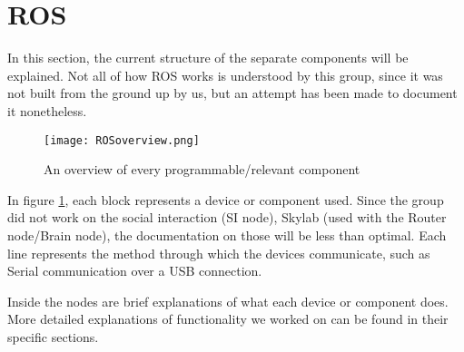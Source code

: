 \section{ROS}

In this section, the current structure of the separate components will be explained.
Not all of how ROS works is understood by this group, since it was not built from the ground up by us, but an attempt has been made to document it nonetheless.

\begin{figure}[H]
\centering
\texttt{[image: ROSoverview.png]}
\caption{An overview of every programmable/relevant component}
\label{fig::ROSover}
\end{figure}

In figure \ref{fig::ROSover}, each block represents a device or component used.
Since the group did not work on the social interaction (SI node), Skylab (used with the Router node/Brain node), the documentation on those will be less than optimal.
Each line represents the method through which the devices communicate, such as Serial communication over a USB connection.

Inside the nodes are brief explanations of what each device or component does.
More detailed explanations of functionality we worked on can be found in their specific sections.
\newpage
